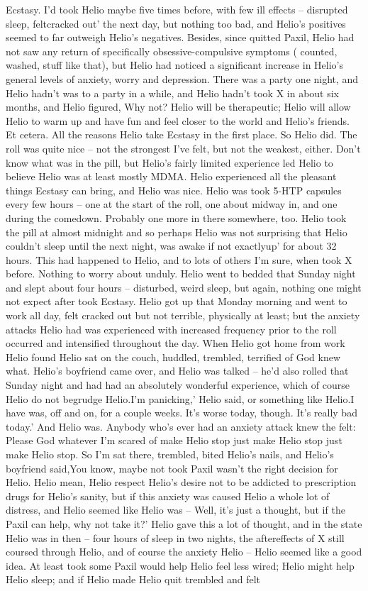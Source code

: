 \documentclass[12pt]{book}
\begin{document}
Ecstasy. I'd took Helio maybe five times before, with few ill effects -- disrupted sleep, feltcracked out' the next day, but nothing too bad, and Helio's positives seemed to far outweigh Helio's negatives. Besides, since quitted Paxil, Helio had not saw any return of specifically obsessive-compulsive symptoms ( counted, washed, stuff like that), but Helio had noticed a significant increase in Helio's general levels of anxiety, worry and depression. There was a party one night, and Helio hadn't was to a party in a while, and Helio hadn't took X in about six months, and Helio figured, Why not? Helio will be therapeutic; Helio will allow Helio to warm up and have fun and feel closer to the world and Helio's friends. Et cetera. All the reasons Helio take Ecstasy in the first place. So Helio did. The roll was quite nice -- not the strongest I've felt, but not the weakest, either. Don't know what was in the pill, but Helio's fairly limited experience led Helio to believe Helio was at least mostly MDMA. Helio experienced all the pleasant things Ecstasy can bring, and Helio was nice. Helio was took 5-HTP capsules every few hours -- one at the start of the roll, one about midway in, and one during the comedown. Probably one more in there somewhere, too. Helio took the pill at almost midnight and so perhaps Helio was not surprising that Helio couldn't sleep until the next night, was awake if not exactlyup' for about 32 hours. This had happened to Helio, and to lots of others I'm sure, when took X before. Nothing to worry about unduly. Helio went to bedded that Sunday night and slept about four hours -- disturbed, weird sleep, but again, nothing one might not expect after took Ecstasy. Helio got up that Monday morning and went to work all day, felt cracked out but not terrible, physically at least; but the anxiety attacks Helio had was experienced with increased frequency prior to the roll occurred and intensified throughout the day. When Helio got home from work Helio found Helio sat on the couch, huddled, trembled, terrified of God knew what. Helio's boyfriend came over, and Helio was talked -- he'd also rolled that Sunday night and had had an absolutely wonderful experience, which of course Helio do not begrudge Helio.I'm panicking,' Helio said, or something like Helio.I have was, off and on, for a couple weeks. It's worse today, though. It's really bad today.' And Helio was. Anybody who's ever had an anxiety attack knew the felt: Please God whatever I'm scared of make Helio stop just make Helio stop just make Helio stop. So I'm sat there, trembled, bited Helio's nails, and Helio's boyfriend said,You know, maybe not took Paxil wasn't the right decision for Helio. Helio mean, Helio respect Helio's desire not to be addicted to prescription drugs for Helio's sanity, but if this anxiety was caused Helio a whole lot of distress, and Helio seemed like Helio was -- Well, it's just a thought, but if the Paxil can help, why not take it?' Helio gave this a lot of thought, and in the state Helio was in then -- four hours of sleep in two nights, the aftereffects of X still coursed through Helio, and of course the anxiety Helio -- Helio seemed like a good idea. At least took some Paxil would help Helio feel less wired; Helio might help Helio sleep; and if Helio made Helio quit trembled and felt 
\end{document}
